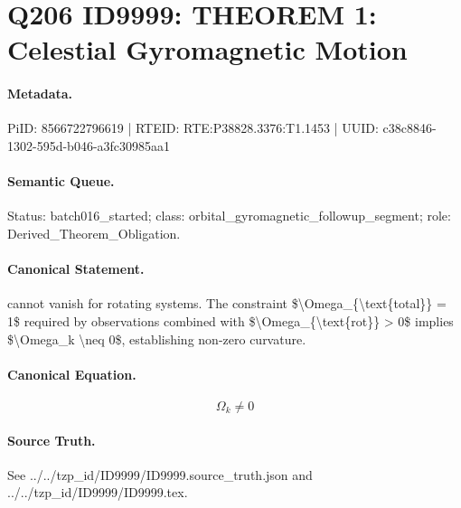 \section*{Q206 ID9999: THEOREM 1: Celestial Gyromagnetic Motion}
\paragraph{Metadata.}
PiID: 8566722796619 | RTEID: RTE:P38828.3376:T1.1453 | UUID: c38c8846-1302-595d-b046-a3fc30985aa1

\paragraph{Semantic Queue.}
Status: batch016\_started; class: orbital\_gyromagnetic\_followup\_segment; role: Derived\_Theorem\_Obligation.

\paragraph{Canonical Statement.}
cannot vanish for rotating systems. The constraint \$\textbackslash{}Omega\_\{\textbackslash{}text\{total\}\} = 1\$ required by observations combined with \$\textbackslash{}Omega\_\{\textbackslash{}text\{rot\}\} > 0\$ implies \$\textbackslash{}Omega\_k \textbackslash{}neq 0\$, establishing non-zero curvature.

\paragraph{Canonical Equation.}
\[
\Omega_k \neq 0
\]

\paragraph{Source Truth.}
See ../../tzp\_id/ID9999/ID9999.source\_truth.json and ../../tzp\_id/ID9999/ID9999.tex.

